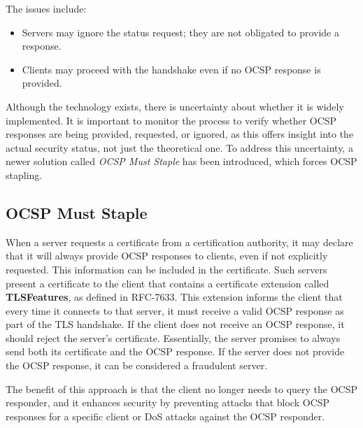 The issues include:
\begin{itemize}
    \item Servers may ignore the status request; they are not
      obligated to provide a response.
    \item Clients may proceed with the handshake even if no OCSP
      response is provided.
\end{itemize}

Although the technology exists, there is uncertainty about whether it
is widely implemented. It is important to monitor the process to
verify whether OCSP responses are being provided, requested, or
ignored, as this offers insight into the actual security status, not
just the theoretical one. To address this uncertainty, a newer
solution called \textit{OCSP Must Staple} has been introduced, which
forces OCSP stapling.
\subsection{OCSP Must Staple}

When a server requests a certificate from a certification authority,
it may declare that it will always provide OCSP responses to clients,
even if not explicitly requested. This information can be included in
the certificate. Such servers present a certificate to the client that
contains a certificate extension called \textbf{TLSFeatures}, as
defined in RFC-7633. This extension informs the client that every time
it connects to that server, it must receive a valid OCSP response as
part of the TLS handshake. If the client does not receive an OCSP
response, it should reject the server’s certificate. Essentially, the
server promises to always send both its certificate and the OCSP
response. If the server does not provide the OCSP response, it can be
considered a fraudulent server.

The benefit of this approach is that the client no longer needs to
query the OCSP responder, and it enhances security by preventing
attacks that block OCSP responses for a specific client or DoS attacks
against the OCSP responder.

